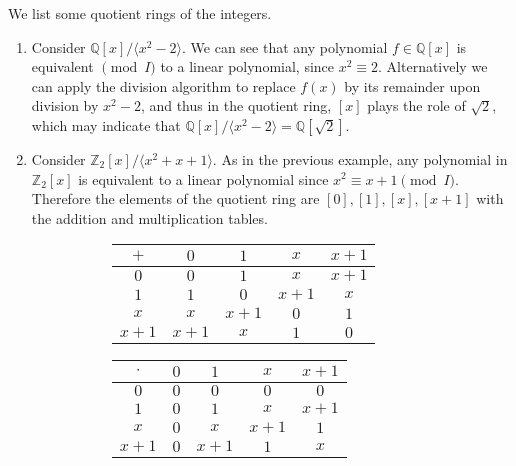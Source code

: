   \begin{example}
    We list some quotient rings of the integers.  
    \begin{enumerate}
      \item Consider $\mathbb{Q}[x] / \langle x^2 - 2 \rangle$. We can see that any polynomial $f \in \mathbb{Q}[x]$ is equivalent $\pmod{I}$ to a linear polynomial, since $x^2 \equiv 2$. Alternatively we can apply the division algorithm to replace $f(x)$ by its remainder upon division by $x^2 - 2$, and thus in the quotient ring, $[x]$ plays the role of $\sqrt{2}$, which may indicate that $\mathbb{Q}[x] / \langle x^2 - 2 \rangle = \mathbb{Q}[\sqrt{2}]$. 
      \item Consider $\mathbb{Z}_2 [x]/ \langle x^2 + x + 1 \rangle$. As in the previous example, any polynomial in $\mathbb{Z}_2[x]$ is equivalent to a linear polynomial since $x^2 \equiv x + 1 \pmod{I}$. Therefore the elements of the quotient ring are $[0], [1], [x], [x+1]$ with the addition and multiplication tables. 

      \begin{figure}[H]
        \centering
        \begin{subfigure}[b]{0.48\textwidth}
          \centering
          \begin{tabular}{c|cccc}
            $+$ & $0$ & $1$ & $x$ & $x + 1$ \\
            \hline
            $0$ & $0$ & $1$ & $x$ & $x + 1$ \\
            $1$ & $1$ & $0$ & $x + 1$ & $x$ \\
            $x$ & $x$ & $x + 1$ & $0$ & $1$ \\
            $x + 1$ & $x + 1$ & $x$ & $1$ & $0$ \\
          \end{tabular}
          \caption{}
        \end{subfigure}
        \hfill 
        \begin{subfigure}[b]{0.48\textwidth}
          \centering
          \begin{tabular}{c|cccc}
            $\cdot$ & $0$ & $1$ & $x$ & $x + 1$ \\
            \hline
            $0$ & $0$ & $0$ & $0$ & $0$ \\
            $1$ & $0$ & $1$ & $x$ & $x + 1$ \\
            $x$ & $0$ & $x$ & $x + 1$ & $1$ \\
            $x + 1$ & $0$ & $x + 1$ & $1$ & $x$ \\
          \end{tabular}
          \caption{}
        \end{subfigure}
        \label{fig:boolean-algebra-tables}
      \end{figure}
    \end{enumerate}
  \end{example}

